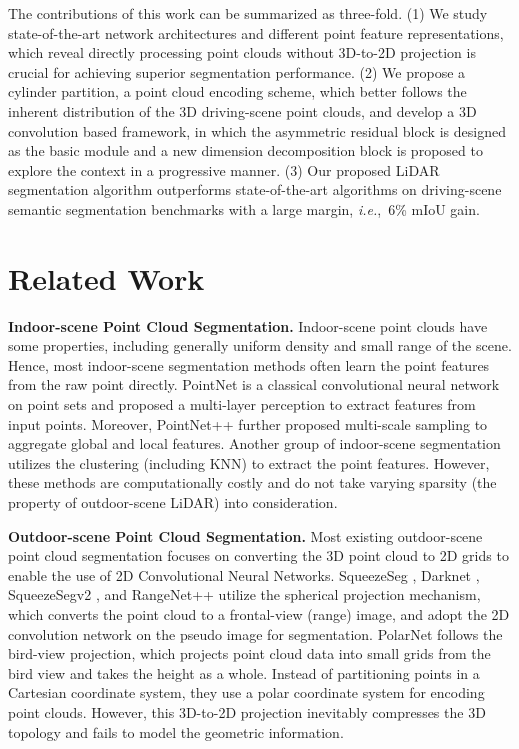 \documentclass{article}
\def\ie{\emph{i.e.}}
\begin{document}
     The contributions of this work {can be summarized as three-fold. (1) We study state-of-the-art network architectures and different point feature representations, which reveal {directly processing point clouds without 3D-to-2D projection is crucial for achieving superior segmentation performance.} (2) We propose a cylinder partition, {a point cloud encoding scheme, which better follows the inherent distribution of the 3D driving-scene point clouds}, and develop a 3D convolution based framework, in which the asymmetric residual block is designed as the basic module and a new dimension decomposition block is proposed to explore the context in a progressive manner. (3) Our proposed LiDAR segmentation algorithm outperforms state-of-the-art algorithms on {driving-scene} semantic segmentation benchmarks with a large margin, \ie,~6\% mIoU gain.}
     
        




 
\section{Related Work}
   


   \textbf{Indoor-scene Point Cloud Segmentation.} Indoor-scene point clouds have some properties, including generally uniform density and small range of the scene. Hence, most indoor-scene segmentation methods \citep{qi2017pointnet, thomas2019kpconv, wu2019pointconv, wang2019dynamic,velivckovic2017graph, lyu2020learning, engelmann20203d, zhang2020fusion} often learn the point features from the raw point directly. PointNet \citep{qi2017pointnet} is a classical convolutional neural network on point sets and proposed a multi-layer perception to extract features from input points. Moreover, PointNet++ \citep{qi2017pointnet++} further proposed multi-scale sampling to aggregate global and local features. Another group of indoor-scene segmentation~\cite{wang2019dynamic,velivckovic2017graph} utilizes the clustering (including KNN) to extract the point features. 
   However, these methods are computationally costly and do not take varying sparsity (the property of outdoor-scene LiDAR) into consideration. 

   
   \textbf{Outdoor-scene Point Cloud Segmentation.}
   Most existing outdoor-scene point cloud segmentation focuses on converting the 3D point cloud to 2D grids to enable the use of 2D Convolutional Neural Networks. SqueezeSeg \citep{wu2018squeezeseg}, Darknet \citep{behley2019semantickitti}, SqueezeSegv2 \citep{wu2019squeezesegv2},
  and RangeNet++ \citep{milioto2019rangenet++} utilize the spherical projection mechanism, which converts the point cloud to 
  a frontal-view (range) image, and adopt the 2D convolution network on the pseudo image for segmentation. PolarNet \citep{zhang2020polarnet} follows the bird-view projection, which projects point cloud data into small grids from the bird view and takes the height as a whole. Instead of partitioning points in a Cartesian coordinate system, they use a polar coordinate system for encoding point clouds. However, this 3D-to-2D projection inevitably compresses the 3D topology and fails to model the geometric information.
  
\end{document}
